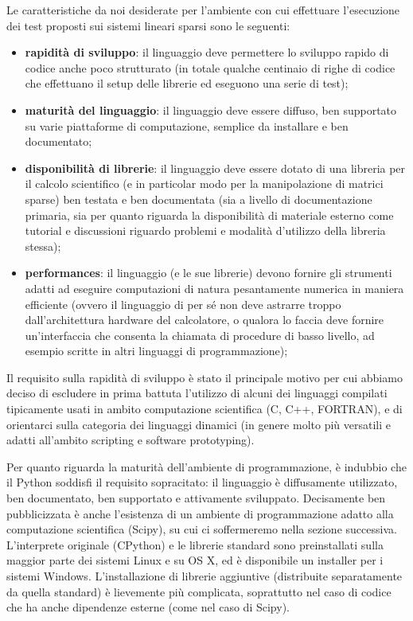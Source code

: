 \documentclass[11pt,a4paper]{scrartcl}
\begin{document}
Le caratteristiche da noi desiderate per l'ambiente con cui effettuare l'esecuzione dei test proposti sui sistemi lineari sparsi sono le seguenti:
\begin{itemize}
	\item \textbf{rapidità di sviluppo}: il linguaggio deve permettere lo sviluppo rapido di codice anche poco strutturato (in totale qualche centinaio di righe di codice che effettuano il setup delle librerie ed eseguono una serie di test);
	\item \textbf{maturità del linguaggio}: il linguaggio deve essere diffuso, ben supportato su varie piattaforme di computazione, semplice da installare e ben documentato;
	\item \textbf{disponibilità di librerie}: il linguaggio deve essere dotato di una libreria per il calcolo scientifico (e in particolar modo per la manipolazione di matrici sparse) ben testata e ben documentata (sia a livello di documentazione primaria, sia per quanto riguarda la disponibilità di materiale esterno come tutorial e discussioni riguardo problemi e modalità d'utilizzo della libreria stessa);
	\item \textbf{performances}: il linguaggio (e le sue librerie) devono fornire gli strumenti adatti ad eseguire computazioni di natura pesantamente numerica in maniera efficiente (ovvero il linguaggio di per sé non deve astrarre troppo dall'architettura hardware del calcolatore, o qualora lo faccia deve fornire un'interfaccia che consenta la chiamata di procedure di basso livello, ad esempio scritte in altri linguaggi di programmazione);
\end{itemize}

Il requisito sulla rapidità di sviluppo è stato il principale motivo per cui abbiamo deciso di escludere in prima battuta l'utilizzo di alcuni dei linguaggi compilati tipicamente usati in ambito computazione scientifica (C, C++, FORTRAN), e di orientarci sulla categoria dei linguaggi dinamici (in genere molto più versatili e adatti all'ambito scripting e software prototyping). 

Per quanto riguarda la maturità dell'ambiente di programmazione, è indubbio che il Python soddisfi il requisito sopracitato: il linguaggio è diffusamente utilizzato, ben documentato, ben supportato e attivamente sviluppato. Decisamente ben pubblicizzata è anche l'esistenza di un ambiente di programmazione adatto alla computazione scientifica (Scipy), su cui ci soffermeremo nella sezione successiva. L'interprete originale (CPython) e le librerie standard sono preinstallati sulla maggior parte dei sistemi Linux e su OS X, ed è disponibile un installer per i sistemi Windows. L'installazione di librerie aggiuntive (distribuite separatamente da quella standard) è lievemente più complicata, soprattutto nel caso di codice che ha anche dipendenze esterne (come nel caso di Scipy).
\end{document}
